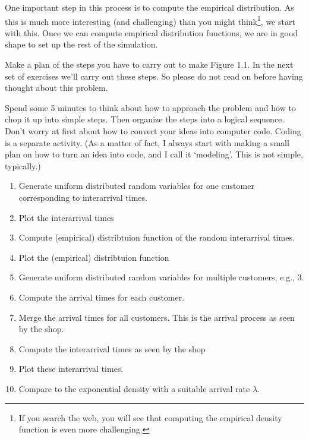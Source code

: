 \documentclass{scrartcl}
\begin{document}
One important step in this process is to compute the empirical distribution. As this is much more interesting (and challenging) than you might think\footnote{If you search the web, you will see that computing the empirical density function is even more challenging.}, we start with this. Once we can compute empirical distribution functions, we are in good shape to set up the rest of the simulation. 

\begin{exercise}
  Make a plan of the steps you have to carry out to make Figure 1.1. In the next set of exercises we'll carry out these steps. So please do not read on before having thought about this problem.

  Spend some 5 minutes to think about how to approach the problem and how to chop it up into simple steps. Then organize the steps into a logical sequence. Don't worry at first about how to convert your ideas into computer code. Coding is a separate activity.  (As a matter of fact, I always start with making a small plan on how to turn an idea into code, and I call it `modeling'. This is not simple, typically.) 

  \begin{solution}
    \begin{enumerate}
    \item Generate  uniform distributed random variables for one customer corresponding to interarrival times.
    \item Plot the interarrival times
    \item Compute (empirical) distribtuion function of the random interarrival times.
    \item Plot the (empirical) distribtuion function
    \item Generate  uniform distributed random variables for multiple customers, e.g., 3. 
    \item Compute the arrival times for each customer.
    \item Merge  the arrival times for all customers. This is the arrival process as seen by the shop.
    \item Compute the interarrival times as seen by the shop
    \item Plot these interarrival times.
    \item Compare to the exponential density with a suitable arrival rate $\lambda$. 
    \end{enumerate}
  \end{solution}
\end{exercise}
\end{document}
